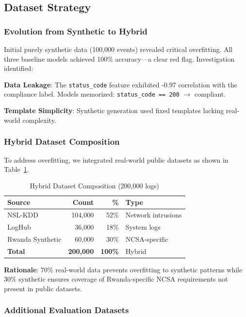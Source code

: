 \documentclass[11pt,conference]{IEEEtran}
\begin{document}
\subsection{Dataset Strategy}

\subsubsection{Evolution from Synthetic to Hybrid}

Initial purely synthetic data (100,000 events) revealed critical overfitting. All three baseline models achieved 100\% accuracy---a clear red flag. Investigation identified:

\textbf{Data Leakage}: The \texttt{status\_code} feature exhibited -0.97 correlation with the compliance label. Models memorized: \texttt{status\_code == 200} $\rightarrow$ compliant.

\textbf{Template Simplicity}: Synthetic generation used fixed templates lacking real-world complexity.

\subsubsection{Hybrid Dataset Composition}

To address overfitting, we integrated real-world public datasets as shown in Table~\ref{tab:dataset}.

\begin{table}[!t]
\centering
\caption{Hybrid Dataset Composition (200,000 logs)}
\label{tab:dataset}
\begin{tabular}{@{}lrrp{3cm}@{}}
\toprule
\textbf{Source} & \textbf{Count} & \textbf{\%} & \textbf{Type} \\
\midrule
NSL-KDD \cite{nslkdd} & 104,000 & 52\% & Network intrusions \\
LogHub \cite{loghub} & 36,000 & 18\% & System logs \\
Rwanda Synthetic & 60,000 & 30\% & NCSA-specific \\
\midrule
\textbf{Total} & \textbf{200,000} & \textbf{100\%} & Hybrid \\
\bottomrule
\end{tabular}
\end{table}

\textbf{Rationale}: 70\% real-world data prevents overfitting to synthetic patterns while 30\% synthetic ensures coverage of Rwanda-specific NCSA requirements not present in public datasets.

\subsubsection{Additional Evaluation Datasets}
\end{document}
